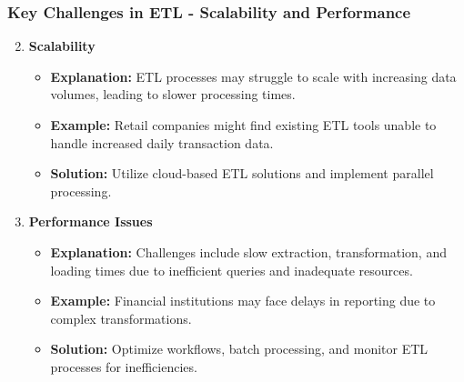 \documentclass{beamer}
\begin{document}
\begin{frame}[fragile]
    \frametitle{Key Challenges in ETL - Scalability and Performance}
    \begin{enumerate}
        \setcounter{enumi}{1}
        \item \textbf{Scalability}
        \begin{itemize}
            \item \textbf{Explanation:} ETL processes may struggle to scale with increasing data volumes, leading to slower processing times.
            \item \textbf{Example:} Retail companies might find existing ETL tools unable to handle increased daily transaction data.
            \item \textbf{Solution:} Utilize cloud-based ETL solutions and implement parallel processing.
        \end{itemize}
        
        \item \textbf{Performance Issues}
        \begin{itemize}
            \item \textbf{Explanation:} Challenges include slow extraction, transformation, and loading times due to inefficient queries and inadequate resources.
            \item \textbf{Example:} Financial institutions may face delays in reporting due to complex transformations.
            \item \textbf{Solution:} Optimize workflows, batch processing, and monitor ETL processes for inefficiencies.
        \end{itemize}
    \end{enumerate}
\end{frame}
\end{document}
